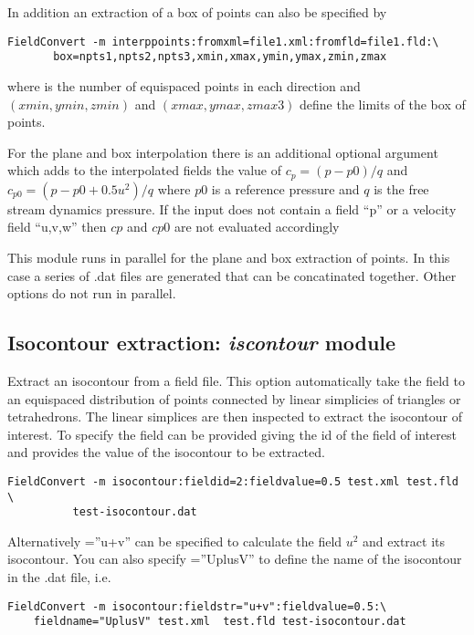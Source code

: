 In addition an extraction of a box of points can also be specified by
\begin{lstlisting}[style=BashInputStyle] 
  FieldConvert -m interppoints:fromxml=file1.xml:fromfld=file1.fld:\
       box=npts1,npts2,npts3,xmin,xmax,ymin,ymax,zmin,zmax
\end{lstlisting}
where  is the number of equispaced points in each 
direction and $(xmin,ymin,zmin)$ and $(xmax,ymax,zmax3)$ 
define the limits of the box of points. 

For the plane and box interpolation there is an additional optional
argument \inltt{cp=p0,q} which adds to the interpolated fields the value of
$c_p=(p-p0)/q$ and $c_{p0}=(p-p0+0.5 u^2)/q$ where $p0$ is a reference
pressure and $q$ is the free stream dynamics pressure. If the input
does not contain a field ``p'' or a velocity field ``u,v,w'' then $cp$
and $cp0$ are not evaluated accordingly
%
\begin{notebox} 
This module  runs in parallel for the plane and box extraction of points. In this case a series of .dat files are generated that can be concatinated together. Other options do not run in parallel.
\end{notebox}
%
%
%
\subsection{Isocontour extraction: \textit{iscontour} module}

Extract an isocontour from a field file. This option automatically
take the field to an equispaced distribution of points connected by
linear simplicies of triangles or tetrahedrons. The linear simplices
are then inspected to extract the isocontour of interest. To specify
the field \inltt{fieldid} can be provided giving the id of the field
of interest and \inltt{fieldvalue} provides the value of the
isocontour to be extracted.

\begin{lstlisting}[style=BashInputStyle]
  FieldConvert -m isocontour:fieldid=2:fieldvalue=0.5 test.xml test.fld \
          test-isocontour.dat
\end{lstlisting}

Alternatively =''u+v'' can be specified to calculate
the field $u^2$ and extract its isocontour. You can also specify
\inltt{fieldname}=''UplusV'' to define the name of the isocontour in
the .dat file, i.e.
\begin{lstlisting}[style=BashInputStyle]
  FieldConvert -m isocontour:fieldstr="u+v":fieldvalue=0.5:\
    fieldname="UplusV" test.xml  test.fld test-isocontour.dat
\end{lstlisting}

